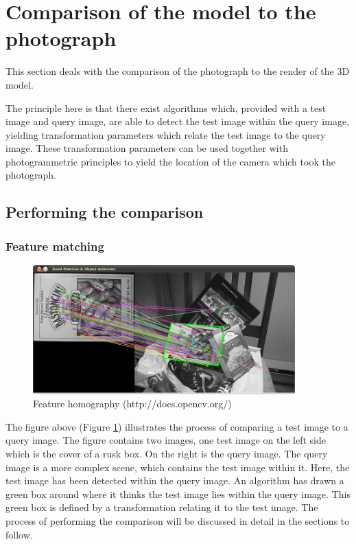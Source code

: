 \documentclass[11pt,a4paper]{report}
\begin{document}
	\section{Comparison of the model to the photograph}
		This section deals with the comparison of the photograph to the render of the 3D model.
		
		The principle here is that there exist algorithms which, provided with a test image and query image, are able to detect the test image within the query image, yielding transformation parameters which relate the test image to the query image. These transformation parameters can be used together with photogrammetric principles to yield the location of the camera which took the photograph.
		
		\subsection{Performing the comparison}
			\subsubsection{Feature matching}
				\begin{figure}[H]
					\centering
					\includegraphics[width=0.9\textwidth]{feature_homography_example}
					\caption{Feature homography (http://docs.opencv.org/)}
					\label{fig:feature_homogrophy}
				\end{figure}
				
				The figure above (Figure \ref{fig:feature_homogrophy}) illustrates the process of comparing a test image to a query image. The figure contains two images, one test image on the left side which is the cover of a rusk box. On the right is the query image. The query image is a more complex scene, which contains the test image within it. Here, the test image has been detected within the query image. An algorithm has drawn a green box around where it thinks the test image lies within the query image. This green box is defined by a transformation relating it to the test image. The process of performing the comparison will be discussed in detail in the sections to follow.
			
\end{document}

